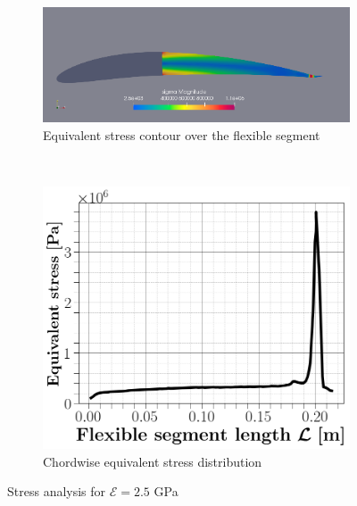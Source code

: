 \documentclass[conf]{new-aiaa}
\begin{document}
\begin{figure}[ht!]
\centering
\begin{subfigure}{.4\textwidth}
\includegraphics[width=0.99\columnwidth]{Figures/sigma.png}
\caption{\label{fig:stress} Equivalent stress contour over the flexible segment}
\end{subfigure}\\
\begin{subfigure}{.4\textwidth}
\includegraphics[width=0.99\columnwidth]{figs/equivalentstress.png}
\caption{Chordwise equivalent stress distribution\label{fig:stress2.5GPa}}
\end{subfigure}
\caption{\label{fig:displ} Stress analysis for $\mathcal{E}= 2.5$ GPa }
\end{figure}
\end{document}

